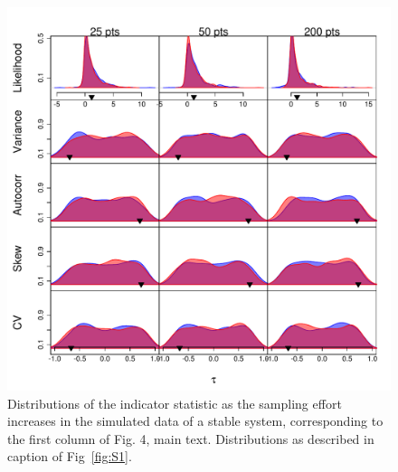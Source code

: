 \documentclass[11pt]{elsarticle}
\begin{document}
\begin{figure}[ht]
  \begin{center}
    \includegraphics{FigS2.pdf}
  \end{center}
  \caption{Distributions of the indicator statistic as the sampling effort increases in the simulated data of a stable system, corresponding to the first column of Fig. 4, main text.  Distributions as described in caption of Fig~\ref{fig:S1}.}
  \label{fig:S2}
\end{figure}
\end{document}

